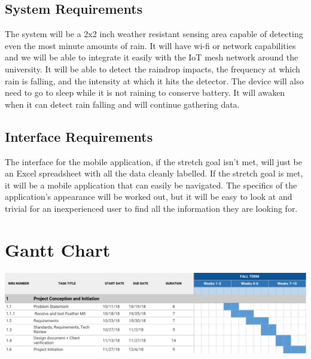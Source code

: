 \documentclass[letterpaper,10pt,draftclsnofoot,onecolumn]{article}
\begin{document}
\subsection{System Requirements}
The system will be a 2x2 inch weather resistant sensing area capable of detecting even the most minute amounts of rain. It will have wi-fi or network capabilities and we will be able to integrate it easily with the IoT mesh network around the university. It will be able to detect the raindrop impacts, the frequency at which rain is falling, and the intensity at which it hits the detector. The device will also need to go to sleep while it is not raining to conserve battery. It will awaken when it can detect rain falling and will continue gathering data.

\subsection{Interface Requirements}
The interface for the mobile application, if the stretch goal isn't met, will just be an Excel spreadsheet with all the data cleanly labelled. If the stretch goal is met, it will be a mobile application that can easily be navigated. The specifics of the application's appearance will be worked out, but it will be easy to look at and trivial for an inexperienced user to find all the information they are looking for.

\section{Gantt Chart}


\includegraphics[scale=0.55]{GanttChart.png}
\newline




\end{document}
